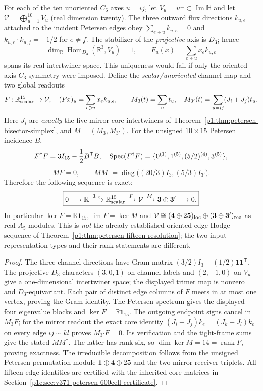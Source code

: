 \documentclass[11pt]{article}
\begin{document}
\begin{theorem}
\label{p1:thm:v371-petersen-tangent-exact-sequence}
For each of the ten unoriented $C_6$ axes $u=ij$, let
$V_u=u^\perp\subset\operatorname{Im}\mathbb H$ and let
$\mathcal V=\bigoplus_{u=1}^{10}V_u$ (real dimension twenty).
The three outward flux directions $k_{u,e}$ attached to the incident
Petersen edges obey $\sum_{e\ni u}k_{u,e}=0$ and
$k_{u,e}\cdot k_{u,f}=-1/2$ for $e\ne f$.
The stabilizer of the \emph{projective} axis is $D_3$; hence
\[
 \dim_{\mathbb R}\operatorname{Hom}_{D_3}(\mathbb R^3,V_u)=1,
 \qquad F_u(x)=\sum_{e\ni u}x_e k_{u,e}
\]
spans its real intertwiner space. This uniqueness would fail if only the
oriented-axis $C_3$ symmetry were imposed.
Define the \emph{scalar/unoriented} channel map and two global readouts
\[
 F:\mathbb R^{15}_{\rm scalar}\to\mathcal V,
 \quad (Fx)_u=\sum_{e\ni u}x_e k_{u,e},
 \qquad
 M_3(t)=\sum_ut_u,
 \quad M_{3'}(t)=\sum_{u=ij}(J_i+J_j)t_u.
\]
Here $J_i$ are \emph{exactly} the five mirror-core intertwiners of
Theorem~\ref{p1:thm:petersen-bisector-simplex}, and $M=(M_3,M_{3'})$.
For the unsigned $10\times15$ Petersen incidence $B$,
\[
 F^\dagger F=3I_{15}-{1\over2}B^{\mathsf T}B,
 \quad\operatorname{Spec}(F^\dagger F)
 =\{0^{(1)},1^{(5)},(5/2)^{(4)},3^{(5)}\},
\]
\[
 MF=0,\qquad MM^\dagger=\operatorname{diag}
 \bigl((20/3)I_3,(5/3)I_{3'}\bigr).
\]
Therefore the following sequence is exact:
\[
 \boxed{0\longrightarrow\mathbb R
 \xrightarrow{\mathbf1_{15}}\mathbb R^{15}_{\rm scalar}
 \xrightarrow{F}\mathcal V\xrightarrow{M}
 \mathbf3\oplus\mathbf3'\longrightarrow0.}
\]
In particular $\ker F=\mathbb R\mathbf1_{15}$,
$\operatorname{im}F=\ker M$ and
$\mathcal V\cong(\mathbf4\oplus2\mathbf5)_{\rm loc}
\oplus(\mathbf3\oplus\mathbf3')_{\rm rec}$ as real $A_5$ modules.
This is \emph{not} the already-established oriented-edge Hodge sequence
of Theorem~\ref{p1:thm:petersen-fifteen-resolution}; the two input
representation types and their rank statements are different.
\end{theorem}
\begin{proof}
The three channel directions have Gram matrix
$(3/2)I_3-(1/2)\mathbf1\mathbf1^\mathsf T$. The projective $D_3$
characters $(3,0,1)$ on channel labels and $(2,-1,0)$ on $V_u$
give a one-dimensional intertwiner space; the displayed trimer map
is nonzero and $D_3$-equivariant. Each pair of distinct edge columns
of $F$ meets in at most one vertex, proving the Gram identity.
The Petersen spectrum gives the displayed four eigenvalue blocks and
$\ker F=\mathbb R\mathbf1_{15}$. The outgoing endpoint signs cancel
in $M_3F$; for the mirror readout the exact core identity
$(J_i+J_j)k_e=(J_k+J_l)k_e$ on every edge $ij\sim kl$ proves
$M_{3'}F=0$. Its verification and the tight-frame sums give the
stated $MM^\dagger$. The latter has rank six, so
$\dim\ker M=14=\operatorname{rank}F$, proving exactness. The
irreducible decomposition follows from the unsigned Petersen
permutation module $\mathbf1\oplus\mathbf4\oplus2\mathbf5$
and the two mirror receiver triplets. All fifteen edge identities
are certified with the inherited core matrices in
Section~\ref{p1c:sec:v371-petersen-600cell-certificate}.
\end{proof}
\end{document}

